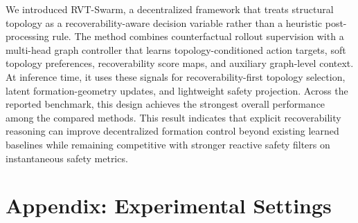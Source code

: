 \documentclass{ieeeaccess}
\begin{document}
We introduced RVT-Swarm, a decentralized framework that treats
structural topology as a recoverability-aware decision variable rather
than a heuristic post-processing rule. The method combines
counterfactual rollout supervision with a multi-head graph controller
that learns topology-conditioned action targets, soft topology
preferences, recoverability score maps, and auxiliary graph-level
context. At inference time, it uses these signals for
recoverability-first topology selection, latent formation-geometry
updates, and lightweight safety projection. Across the reported
benchmark, this design achieves the strongest overall performance among
the compared methods. This result indicates that explicit
recoverability reasoning can improve decentralized formation control
beyond existing learned baselines while remaining competitive with
stronger reactive safety filters on instantaneous safety metrics.




\appendix
\raggedbottom

\section*{Appendix: Experimental Settings}
\label{app:hyperparams}
\end{document}
